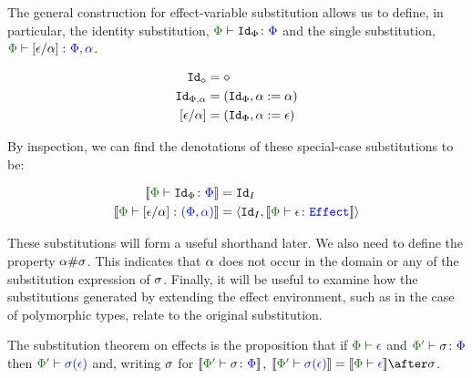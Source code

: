 \documentclass{Report}
\begin{document}
The general construction for effect-variable substitution allows us to define, in particular, the identity substitution, $\typerelation{\P}{\Id{\P}}{\P}$ and the single substitution, $\typerelation{\P}{\ssub{\a}{\e}}{\P,\a}$.


\begin{align}\label{SpecialSubs}
    \texttt{Id}_{\diamond} & = \diamond\\
    \texttt{Id}_{\Phi,\alpha} & = (\texttt{Id}_{\Phi}, \alpha:=\alpha)\\
    \left[\epsilon / \alpha\right] & = (\texttt{Id}_{\Phi}, \alpha:= \epsilon)
\end{align}

By inspection, we can find the denotations of these special-case substitutions to be:

\begin{align}\label{SpecialSubsDenotations}
    \deno{\typerelation{\P}{\Id{\P}}{\P}} & = \Id{I}\\
    \deno{\typerelation{\P}{\ssub{\a}{\e}}{(\P,\a)}} & = \pr{\Id{I}}{\deno{\typerelation{\P}{\e}{\effect}}}
\end{align}


These substitutions will form a useful shorthand later. We also need to define the property $\alpha \# \sigma$. This indicates that $\alpha$ does not occur in the domain or any of the substitution expression of $\sigma$. Finally, it will be useful to examine how the substitutions generated by extending the effect environment, such as in the case of polymorphic types, relate to the original substitution.




\begin{theorem}
    The substitution theorem on effects is the proposition that if $\wellformed{\P}{\e}$ and $\typerelation{\P'}{\si}{\P}$ then $\wellformed{\P'}{\si(\e)}$ and, writing $\sigma$ for $\deno{\typerelation{\P'}{\si}{\P}}$,  $\deno{\wellformed{\P'}{\si(\e)}} = \deno{\wellformed{\P}{\e}}\after\si$. 
\end{theorem}
\end{document}
